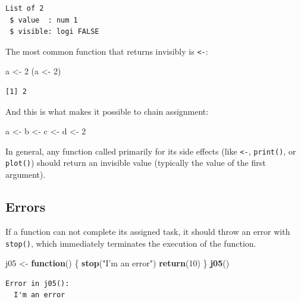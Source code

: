 \documentclass[]{book}
\newenvironment{Shaded}{\begin{snugshade}}{\end{snugshade}}
\newcommand{\ControlFlowTok}[1]{\textcolor[rgb]{0.13,0.29,0.53}{\textbf{#1}}}
\newcommand{\DecValTok}[1]{\textcolor[rgb]{0.00,0.00,0.81}{#1}}
\newcommand{\KeywordTok}[1]{\textcolor[rgb]{0.13,0.29,0.53}{\textbf{#1}}}
\newcommand{\NormalTok}[1]{#1}
\newcommand{\StringTok}[1]{\textcolor[rgb]{0.31,0.60,0.02}{#1}}
\theoremstyle{definition}
\theoremstyle{definition}
\theoremstyle{definition}
\theoremstyle{remark}
\begin{document}
\begin{verbatim}
List of 2
 $ value  : num 1
 $ visible: logi FALSE
\end{verbatim}

The most common function that returns invisibly is
\texttt{\textless{}-}:

\begin{Shaded}
\begin{Highlighting}[]
\NormalTok{a <-}\StringTok{ }\DecValTok{2}
\NormalTok{(a <-}\StringTok{ }\DecValTok{2}\NormalTok{)}
\end{Highlighting}
\end{Shaded}

\begin{verbatim}
[1] 2
\end{verbatim}

And this is what makes it possible to chain assignment:

\begin{Shaded}
\begin{Highlighting}[]
\NormalTok{a <-}\StringTok{ }\NormalTok{b <-}\StringTok{ }\NormalTok{c <-}\StringTok{ }\NormalTok{d <-}\StringTok{ }\DecValTok{2}
\end{Highlighting}
\end{Shaded}

In general, any function called primarily for its side effects (like
\texttt{\textless{}-}, \texttt{print()}, or \texttt{plot()}) should
return an invisible value (typically the value of the first argument).

\hypertarget{errors}{%
\subsection{Errors}\label{errors}}

If a function can not complete its assigned task, it should throw an
error with \texttt{stop()}, which immediately terminates the execution
of the function.

\begin{Shaded}
\begin{Highlighting}[]
\NormalTok{j05 <-}\StringTok{ }\ControlFlowTok{function}\NormalTok{() \{}
  \KeywordTok{stop}\NormalTok{(}\StringTok{"I'm an error"}\NormalTok{)}
  \KeywordTok{return}\NormalTok{(}\DecValTok{10}\NormalTok{)}
\NormalTok{\}}
\KeywordTok{j05}\NormalTok{()}
\end{Highlighting}
\end{Shaded}

\begin{verbatim}
Error in j05():
  I'm an error
\end{verbatim}
\end{document}
